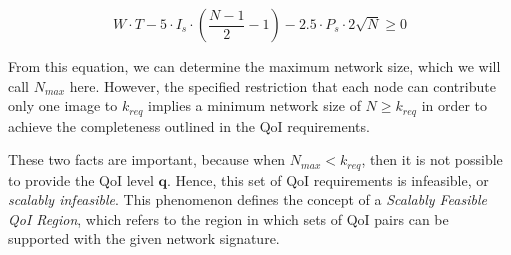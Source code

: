 \begin{equation}
	W \cdot T - 5 \cdot I_s \cdot (\frac{N-1}{2}-1) - 2.5 \cdot P_s \cdot 2 \sqrt{N} \geq 0
\end{equation}

From this equation, we can determine the maximum network size, which we will call $N_{max}$ here.  However, the specified restriction that each node can contribute only one image to $k_{req}$ implies a minimum network size of $N \geq k_{req}$ in order to achieve the completeness outlined in the QoI requirements. 

These two facts are important, because when $N_{max} < k_{req}$, then it is not possible to provide the QoI level $\mathbf{q}$.  Hence, this set of QoI requirements is infeasible, or \emph{scalably infeasible}.  This phenomenon defines the concept of a \emph{Scalably Feasible QoI Region}, which refers to the region in which sets of QoI pairs can be supported with the given network signature.  


